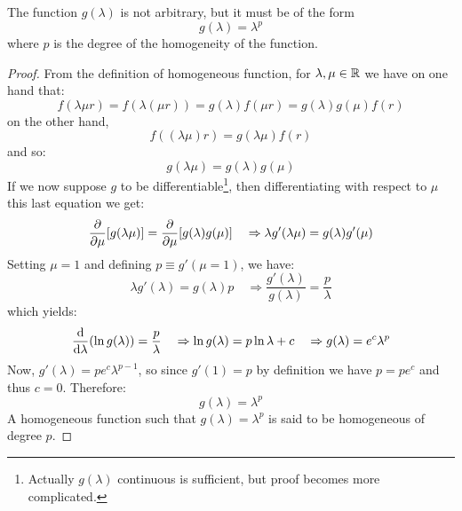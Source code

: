 \documentclass[../../Main/Main.tex]{subfiles}
\begin{document}
\begin{theorem}{}{}
  The function \( g(\lambda ) \) is not arbitrary, but it must be of the form
\begin{equation}
  g(\lambda ) = \lambda ^p
\end{equation}
where \( p \) is the degree of the homogeneity of the function.
\end{theorem}

\begin{proof}
  From the definition of homogeneous function, for \( \lambda, \mu \in \mathbb{R}  \) we have on one hand that:
\begin{equation*}
  f(\lambda \mu r) = f(\lambda (\mu r)) = g (\lambda ) f(\mu r) = g(\lambda ) g(\mu ) f(r)
\end{equation*}
on the other hand,
\begin{equation*}
  f((\lambda \mu )r) = g (\lambda  \mu ) f(r)
\end{equation*}
and so:
\begin{equation*}
  g (\lambda \mu ) = g(\lambda ) g (\mu )
\end{equation*}
If we now suppose \( g \) to be differentiable\footnote{Actually \( g(\lambda ) \) continuous is sufficient, but proof becomes more complicated.}, then differentiating with respect to \( \mu  \)  this last equation we get:
\begin{equation*}
  \pdv{}{\mu } \qty[g(\lambda \mu )] = \pdv{}{\mu } \qty[ g(\lambda )g(\mu  )] \quad
  \Rightarrow \lambda g' (\lambda \mu ) = g (\lambda ) g' (\mu )
\end{equation*}
Setting \( \mu =1 \) and defining \( p \equiv g'( \mu =1 ) \), we have:
\begin{equation*}
   \lambda g'(\lambda ) = g(\lambda ) p \quad \Rightarrow \frac{g'(\lambda )}{g(\lambda )} = \frac{p}{\lambda }
\end{equation*}
which yields:
\begin{equation*}
  \dv{}{\lambda } \qty(\ln{g(\lambda )} ) = \frac{p}{\lambda }   \quad \Rightarrow \ln{g(\lambda )} = p \ln{\lambda } + c \quad \Rightarrow g (\lambda ) = e^c \lambda ^p
\end{equation*}
Now, \( g'(\lambda ) = p e^c \lambda ^{p-1} \), so since \( g'(1) = p \) by definition we have  \( p = p e^c \) and thus \( c=0 \).
Therefore:
\begin{equation*}
  g(\lambda ) = \lambda ^ p
\end{equation*}
A homogeneous function such that \(   g(\lambda ) = \lambda ^ p \)  is said to be homogeneous of degree \( p \).
\end{proof}
\end{document}
